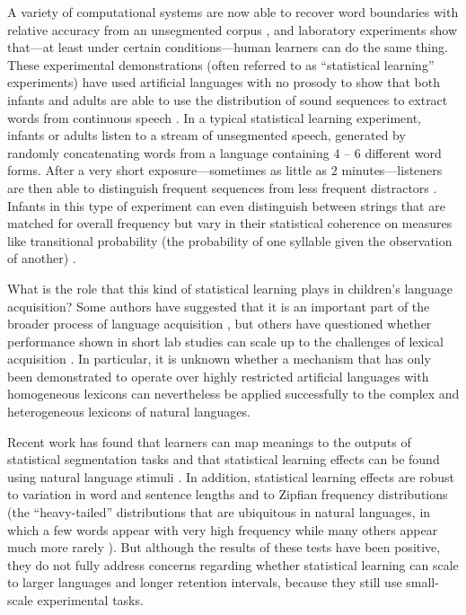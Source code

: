 \documentclass[10pt]{article}
\begin{document}
A variety of computational systems are now able to recover word boundaries with relative accuracy from an unsegmented corpus \cite{goldwater2009,brent1999a}, and laboratory experiments show that---at least under certain conditions---human learners can do the same thing. These experimental demonstrations (often referred to as ``statistical learning'' experiments) have used artificial languages with no prosody to show that both infants and adults are able to use the distribution of sound sequences to extract words from continuous speech \cite{saffran1996a,saffran1996b}. In a typical statistical learning experiment, infants or adults listen to a stream of unsegmented speech, generated by randomly concatenating words from a language containing 4 -- 6 different word forms. After a very short exposure---sometimes as little as 2 minutes---listeners are then able to distinguish frequent sequences from less frequent distractors \cite{saffran1996a}. Infants in this type of experiment can even distinguish between strings that are matched for overall frequency but vary in their statistical coherence on measures like transitional probability (the probability of one syllable given the observation of another) \cite{aslin1998}.

What is the role that this kind of statistical learning plays in children's language acquisition? Some authors have suggested that it is an important part of the broader process of language acquisition \cite{bates1996,saffran2003,kuhl2004}, but others have questioned whether performance shown in short lab studies can scale up to the challenges of lexical acquisition \cite{johnson2010,yang2004,yang2008}. In particular, it is unknown whether a mechanism that has only been demonstrated to operate over highly restricted artificial languages with homogeneous lexicons can nevertheless be applied successfully to the complex and heterogeneous lexicons of natural languages. 

Recent work has found that learners can map meanings to the outputs of statistical segmentation tasks \cite{estes2007,mirman2008,shukla2011} and that statistical learning effects can be found using natural language stimuli \cite{hay2011,pelucchi2009}. In addition, statistical learning effects are robust to variation in word and sentence lengths \cite{frank2010} and to Zipfian frequency distributions (the ``heavy-tailed'' distributions that are ubiquitous in natural languages, in which a few words appear with very high frequency while many others appear much more rarely \cite{kurumada2011}). But although the results of these tests have been positive, they do not fully address concerns regarding whether statistical learning can scale to larger languages and longer retention intervals, because they still use small-scale experimental tasks.
\end{document}
